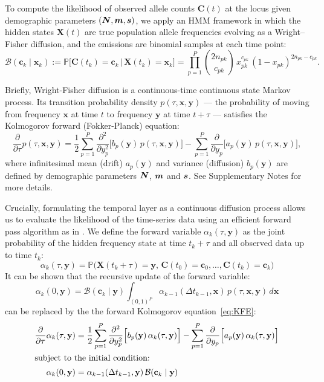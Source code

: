 \documentclass{article}
\def\m{\mbox{\boldmath $m$}}
\def\s{\mbox{\boldmath $s$}}
\def\N{\mbox{\boldmath $N$}}
\begin{document}
To compute the likelihood of observed allele counts $\mathbf{C}(t)$ at the locus given demographic parameters $(\N, \m, \s)$, we apply an HMM framework in which the hidden states $\mathbf{X}(t)$ are true population allele frequencies evolving as a Wright--Fisher diffusion, and the emissions are binomial samples at each time point:
\begin{equation*}\label{eq:binomial}
\mathcal{B}(\mathbf{c}_k \mid \mathbf{x}_k) :=
\mathbb{P} \big[ \mathbf{C}(t_k) = \mathbf{c}_k \,\big|\, \mathbf{X}(t_k) = \mathbf{x}_k \big] =
\prod_{p=1}^P \binom{2n_{pk}}{c_{pk}}\, x_{pk}^{c_{pk}}\, (1-x_{pk})^{2n_{pk}-c_{pk}}.
\end{equation*}

Briefly, Wright-Fisher diffusion is a continuous-time continuous state Markov process.
Its transition probability density $p(\tau, \mathbf{x}, \mathbf{y})$ --- the probability of moving from frequency $\mathbf{x}$ at time $t$ to frequency $\mathbf{y}$ at time $t+\tau$ --- satisfies the Kolmogorov forward (Fokker-Planck) equation:
\begin{equation}\label{eq:KFE}
\frac{\partial}{\partial \tau} p(\tau, \mathbf{x}, \mathbf{y}) = \frac{1}{2} \sum_{p=1}^P \frac{\partial^2}{\partial y_p^2} \Big[ b_{p}(\mathbf{y})\, p(\tau, \mathbf{x}, \mathbf{y}) \Big] - \sum_{p=1}^P \frac{\partial}{\partial y_p} \Big[ a_p(\mathbf{y})\, p(\tau, \mathbf{x}, \mathbf{y}) \Big],
\end{equation}
where infinitesimal mean (drift) $a_p(\mathbf{y})$ and variance (diffusion) $b_p(\mathbf{y})$ are defined by demographic parameters $\N$, $\m$ and $\s$.
See Supplementary Notes for more details.

Crucially, formulating the temporal layer as a continuous diffusion process allows us to evaluate the likelihood of the time-series data using an efficient forward pass algorithm as in \citet{he2020}.
We define the forward variable $\alpha_k(\tau, \mathbf{y})$ as the joint probability of the hidden frequency state at time $t_k + \tau$ and all observed data up to time $t_k$:
$$
\alpha_k(\tau, \mathbf{y}) = \mathbb{P}\big( \mathbf{X}(t_k+\tau) = \mathbf{y},\, \mathbf{C}(t_0) = \mathbf{c}_0, \ldots, \mathbf{C}(t_k) = \mathbf{c}_k \big)
$$
It can be shown that the recursive update of the forward variable:
$$
\alpha_k(0, \mathbf{y}) = \mathcal{B}(\mathbf{c}_k \mid \mathbf{y}) \int_{(0,1)^P} \alpha_{k-1}(\Delta t_{k-1}, \mathbf{x}) \, p(\tau, \mathbf{x}, \mathbf{y}) \, d\mathbf{x}
$$
can be replaced by the the forward Kolmogorov equation~\ref{eq:KFE}:
\begin{align}\label{eq:KFE_alpha}
\frac{\partial}{\partial \tau} \alpha_k(\tau, \mathbf{y}) &=  \frac{1}{2} \sum_{p=1}^P \frac{\partial^2}{\partial y_p^2} \Big[ b_{p}(\mathbf{y})\, \alpha_k(\tau, \mathbf{y}) \Big] - \sum_{p=1}^P \frac{\partial}{\partial y_p} \Big[ a_p(\mathbf{y})\, \alpha_k(\tau, \mathbf{y}) \Big] \\
\intertext{subject to the initial condition:}
\label{eq:KFE_alpha_init}
\alpha_k(0, \mathbf{y}) &= \alpha_{k-1}(\Delta t_{k-1}, \mathbf{y}) \, \mathcal{B}(\mathbf{c}_k \mid \mathbf{y})
\end{align}
\end{document}
